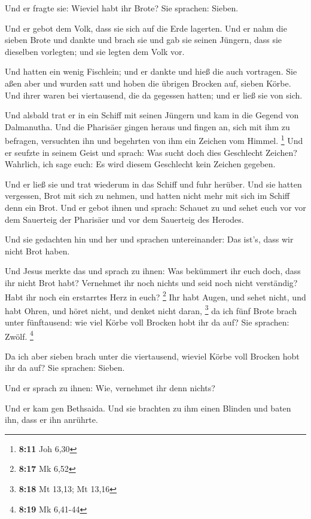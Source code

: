  Und er fragte sie: Wieviel habt ihr Brote? Sie sprachen:
Sieben.

 Und er gebot dem Volk, dass sie sich auf die Erde lagerten.
Und er nahm die sieben Brote und dankte und brach sie und gab sie seinen
Jüngern, dass sie dieselben vorlegten; und sie legten dem Volk vor.

 Und hatten ein wenig Fischlein; und er dankte und hieß die
auch vortragen.  Sie aßen aber und wurden satt und hoben die
übrigen Brocken auf, sieben Körbe.  Und ihrer waren bei
viertausend, die da gegessen hatten; und er ließ sie von sich.

 Und alsbald trat er in ein Schiff mit seinen Jüngern und
kam in die Gegend von Dalmanutha.  Und die Pharisäer gingen
heraus und fingen an, sich mit ihm zu befragen, versuchten ihn und
begehrten von ihm ein Zeichen vom Himmel. \footnote{\textbf{8:11} Joh
  6,30}  Und er seufzte in seinem Geist und sprach: Was
sucht doch dies Geschlecht Zeichen? Wahrlich, ich sage euch: Es wird
diesem Geschlecht kein Zeichen gegeben.

 Und er ließ sie und trat wiederum in das Schiff und fuhr
herüber.  Und sie hatten vergessen, Brot mit sich zu
nehmen, und hatten nicht mehr mit sich im Schiff denn ein Brot.
 Und er gebot ihnen und sprach: Schauet zu und sehet euch
vor vor dem Sauerteig der Pharisäer und vor dem Sauerteig des Herodes.

 Und sie gedachten hin und her und sprachen untereinander:
Das ist's, dass wir nicht Brot haben.

 Und Jesus merkte das und sprach zu ihnen: Was bekümmert
ihr euch doch, dass ihr nicht Brot habt? Vernehmet ihr noch nichts und
seid noch nicht verständig? Habt ihr noch ein erstarrtes Herz in euch?
\footnote{\textbf{8:17} Mk 6,52}  Ihr habt Augen, und sehet
nicht, und habt Ohren, und höret nicht, und denket nicht daran,
\footnote{\textbf{8:18} Mt 13,13; Mt 13,16}  da ich fünf
Brote brach unter fünftausend: wie viel Körbe voll Brocken hobt ihr da
auf? Sie sprachen: Zwölf. \footnote{\textbf{8:19} Mk 6,41-44}

 Da ich aber sieben brach unter die viertausend, wieviel
Körbe voll Brocken hobt ihr da auf? Sie sprachen: Sieben.

 Und er sprach zu ihnen: Wie, vernehmet ihr denn nichts?

 Und er kam gen Bethsaida. Und sie brachten zu ihm einen
Blinden und baten ihn, dass er ihn anrührte.

